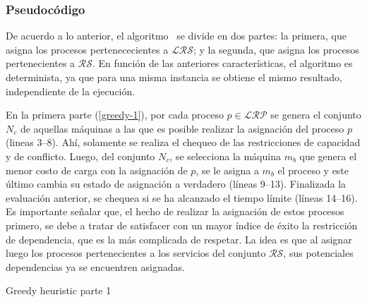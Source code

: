 \documentclass[../informe2.tex]{subfiles}
\begin{document}
\subsubsection{Pseudocódigo}
\label{subs:greedy-seudocodigo}
De acuerdo a lo anterior, el algoritmo \greedy\ se divide en dos partes: la primera, que asigna los procesos pertenececientes a $\mathcal{LRS}$; y la segunda, que asigna los procesos pertenecientes a $\mathcal{RS}$. En función de las anteriores características, el algoritmo es determinista, ya que para una misma instancia se obtiene el mismo resultado, independiente de la ejecución.\par
\noindent En la primera parte (\ref{greedy-1}), por cada proceso $p \in \mathcal{LRP}$ se genera el conjunto $N_c$ de aquellas máquinas a las que es posible realizar la asignación del proceso $p$ (lineas 3--8). Ahí, solamente se realiza el chequeo de las restricciones de capacidad y de conflicto. Luego, del conjunto $N_c$, se selecciona la máquina $m_b$ que genera el menor costo de carga con la asignación de $p$, se le asigna a $m_b$ el proceso y este último cambia su estado de asignación a verdadero (líneas 9--13). Finalizada la evaluación anterior, se chequea si se ha alcanzado el tiempo límite (líneas 14--16). Es importante señalar que, el hecho de realizar la asignación de estos procesos primero, se debe a tratar de satisfacer con un mayor índice de éxito la restricción de dependencia, que es la más complicada de respetar. La idea es que al asignar luego los procesos pertenecientes a los servicios del conjunto $\mathcal{RS}$, sus potenciales dependencias ya se encuentren asignadas. \par
\begin{algorithm}[ht!]
	\caption{Greedy heuristic parte 1}\label{greedy-1}
	\begin{algorithmic}[1]
				\EndIf{}
			\EndFor{}
			\EndIf{}

			\EndIf{}
		\EndFor{}
		\EndProcedure{}
	\end{algorithmic}
\end{algorithm}
\end{document}
